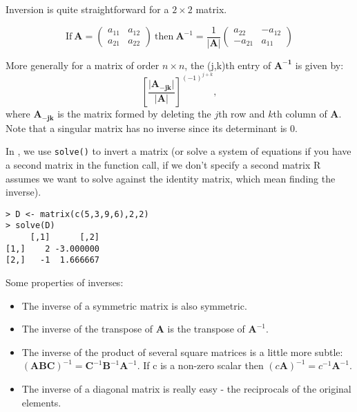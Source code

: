 Inversion is quite straightforward for a $2 \times 2$ matrix.   

\begin{displaymath}
\mbox{If}\ \boldsymbol{A} = \left( \begin{array}{rr} a_{11} & a_{12} \\ a_{21} & a_{22} \end{array} \right)\ \mbox{then}\ \boldsymbol{A}^{-1} = \frac{1}{|\boldsymbol{A}|} \left( \begin{array}{rr} a_{22} & -a_{12} \\ -a_{21} & a_{11} \end{array} \right)
\end{displaymath}

More generally for a matrix of order $n \times n$, the (j,k)th entry of $\boldsymbol{A^{-1}}$ is given by:
\begin{displaymath}
\left[\frac{\lvert \boldsymbol{A_{-jk}} \rvert}{\lvert \boldsymbol{A}\rvert}\right]^{(-1)^{j+k}},
\end{displaymath}
where $\boldsymbol{A_{-jk}}$ is the matrix formed by deleting the $j$th row and $k$th column of $\boldsymbol{A}$.   Note that a singular matrix has no inverse since its determinant is 0.

In \R, we use \texttt{solve()} to invert a matrix (or solve a system of equations if you have a second matrix in the function call, if we don't specify a second matrix R assumes we want to solve against the identity matrix, which mean finding the inverse).

\singlespacing
\begin{verbatim}
> D <- matrix(c(5,3,9,6),2,2)
> solve(D)
     [,1]      [,2]
[1,]    2 -3.000000
[2,]   -1  1.666667
\end{verbatim}
\onehalfspacing

Some properties of inverses:

\begin{itemize}
\item The inverse of a symmetric matrix is also symmetric.  
\item The inverse of the transpose of $\boldsymbol{A}$ is the transpose of $\boldsymbol{A}^{-1}$.   
\item The inverse of the product of several square matrices is a little more subtle:   $(\boldsymbol{A} \boldsymbol{B} \boldsymbol{C})^{-1} = \boldsymbol{C}^{-1} \boldsymbol{B}^{-1} \boldsymbol{A}^{-1}$.   If c is a non-zero scalar then $(c\boldsymbol{A})^{-1} = c^{-1}\boldsymbol{A}^{-1}$.   
\item The inverse of a diagonal matrix is really easy - the reciprocals of the original elements.
\end{itemize}

